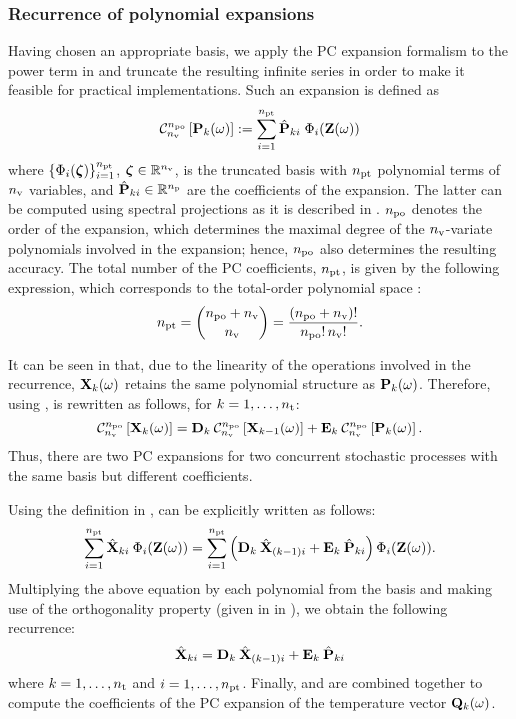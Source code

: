 \subsubsection{Recurrence of polynomial expansions}
Having chosen an appropriate basis, we apply the PC expansion formalism to the power term in  and truncate the resulting infinite series in order to make it feasible for practical implementations.
Such an expansion is defined as
\begin{equation} \elabel{pc-expansion}
  \oPC{\nvars}{\pcorder}{\vP_k(\o)} := \sum_{i = 1}^{\pcterms} \pcc{\vP}_{ki} \; \pcb_i(\vZ(\o))
\end{equation}
where $\{ \Phi_i(\boldsymbol{\zeta}) \}_{i = 1}^{{n_\text{pt}}}$, $\boldsymbol{\zeta} \in \mathbb{R}^{n_\text{v}}$, is the truncated basis with ${n_\text{pt}}$ polynomial terms of ${n_\text{v}}$ variables, and $\hat{\mathbf{P}}_{ki} \in \mathbb{R}^{n_\text{p}}$ are the coefficients of the expansion.
The latter can be computed using spectral projections as it is described in .
${n_\text{po}}$ denotes the order of the expansion, which determines the maximal degree of the ${n_\text{v}}$-variate polynomials involved in the expansion; hence, ${n_\text{po}}$ also determines the resulting accuracy.
The total number of the PC coefficients, ${n_\text{pt}}$, is given by the following expression, which corresponds to the total-order polynomial space \cite{eldred2008, beck2011}:
\begin{equation} \elabel{pc-terms}
  \pcterms = { \pcorder + \nvars \choose \nvars } = \frac{(\pcorder + \nvars)!}{\pcorder! \, \nvars!}.
\end{equation}

It can be seen in  that, due to the linearity of the operations involved in the recurrence, $\mathbf{X}_k(\omega)$ retains the same polynomial structure as $\mathbf{P}_k(\omega)$. Therefore, using ,  is rewritten as follows, for $k = 1, \dotsc, {n_\text{t}}$:
\begin{equation} \elabel{expanded-recurrence}
  \oPC{\nvars}{\pcorder}{\vX_k(\o)} = \mCF_k \: \oPC{\nvars}{\pcorder}{\vX_{k-1}(\o)} + \mCS_k \: \oPC{\nvars}{\pcorder}{\vP_k(\o)}.
\end{equation}
Thus, there are two PC expansions for two concurrent stochastic processes with the same basis but different coefficients.

Using the definition in ,  can be explicitly written as follows:
\[
  \sum_{i = 1}^{\pcterms} \pcc{\vX}_{ki} \: \pcb_i(\vZ(\o)) = \sum_{i = 1}^{\pcterms} \left( \mCF_k \: \pcc{\vX}_{(k - 1)i} + \mCS_k \: \pcc{\vP}_{ki} \right) \pcb_i(\vZ(\o)).
\]
Multiplying the above equation by each polynomial from the basis and making use of the orthogonality property (given in  in ), we obtain the following recurrence:
\begin{equation} \elabel{pc-recurrence}
  \pcc{\vX}_{ki} = \mCF_k \: \pcc{\vX}_{(k - 1)i} + \mCS_k \: \pcc{\vP}_{ki}
\end{equation}
where $k = 1, \dotsc, {n_\text{t}}$ and $i = 1, \dotsc, {n_\text{pt}}$. Finally,  and  are combined together to compute the coefficients of the PC expansion of the temperature vector $\mathbf{Q}_k(\omega)$.

